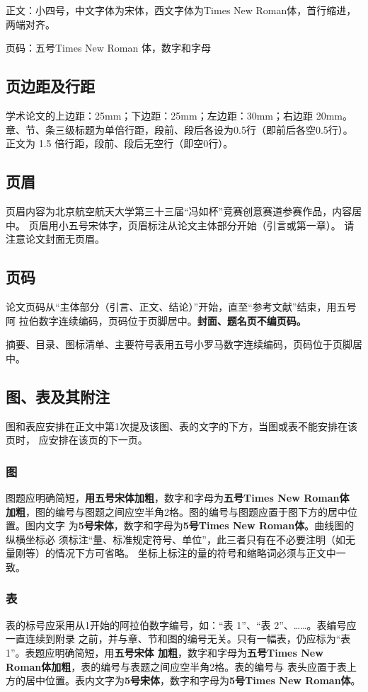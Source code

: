 \documentclass[zihao=-4]{ctexart}
\begin{document}
\begin{spacing}{1.5}
正文：小四号，中文字体为宋体，西文字体为Times New Roman体，首行缩进，两端对齐。

页码：五号Times New Roman 体，数字和字母\par

\subsection{页边距及行距}
学术论文的上边距：25mm；下边距：25mm；左边距：30mm；右边距 20mm。
章、节、条三级标题为单倍行距，段前、段后各设为0.5行（即前后各空0.5行）。
正文为 1.5 倍行距，段前、段后无空行（即空0行）。

\subsection{页眉}
页眉内容为北京航空航天大学第三十三届“冯如杯”竞赛创意赛道参赛作品，内容居中。
页眉用小五号宋体字，页眉标注从论文主体部分开始（引言或第一章）。
请注意论文封面无页眉。

\subsection{页码}
论文页码从“主体部分（引言、正文、结论）”开始，直至“参考文献”结束，用五号阿
拉伯数字连续编码，页码位于页脚居中。\textbf{封面、题名页不编页码。}

摘要、目录、图标清单、主要符号表用五号小罗马数字连续编码，页码位于页脚居中。

\subsection{图、表及其附注}
图和表应安排在正文中第1次提及该图、表的文字的下方，当图或表不能安排在该页时，
应安排在该页的下一页。

\subsubsection{图}
图题应明确简短，\textbf{用五号宋体加粗}，数字和字母为\textbf{五号Times New Roman体
加粗}，图的编号与图题之间应空半角2格。图的编号与图题应置于图下方的居中位置。图内文字
为\textbf{5号宋体}，数字和字母为\textbf{5号Times New Roman体}。曲线图的纵横坐标必
须标注“量、标准规定符号、单位”，此三者只有在不必要注明（如无量刚等）的情况下方可省略。
坐标上标注的量的符号和缩略词必须与正文中一致。

\subsubsection{表}
表的标号应采用从1开始的阿拉伯数字编号，如：“表 1”、“表 2”、……。表编号应一直连续到附录
之前，并与章、节和图的编号无关。只有一幅表，仍应标为“表 1”。表题应明确简短，用\textbf{五号宋体
加粗}，数字和字母为\textbf{五号Times New Roman体加粗}，表的编号与表题之间应空半角2格。表的编号与
表头应置于表上方的居中位置。表内文字为\textbf{5号宋体}，数字和字母为\textbf{5号Times New Roman体}。  


\end{spacing}
\end{document}
